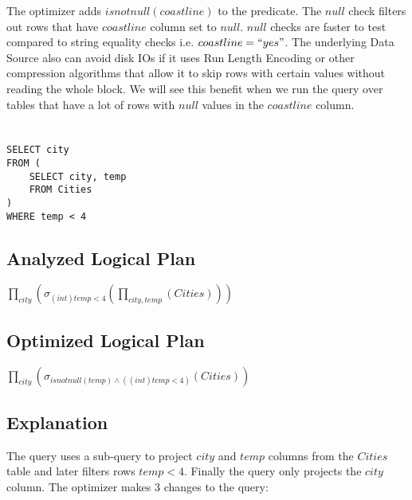 \documentclass[12pt]{article}
\begin{document}
The optimizer adds $isnotnull(coastline)$ to the predicate. The $ null$ check filters out rows that have $coastline$ column set to $null$. $null$ checks are faster to test compared to string equality checks i.e. $coastline = ``yes"$. The underlying Data Source also can avoid disk IOs if it uses Run Length Encoding or other compression algorithms that allow it to skip rows with certain values without reading the whole block. We will see this benefit when we run the query over tables that have a lot of rows with $null$ values in the $coastline$ column. 
\newpage

\section{}
\begin{verbatim}
SELECT city
FROM (
    SELECT city, temp
    FROM Cities
)
WHERE temp < 4
\end{verbatim}

\subsection*{Analyzed Logical Plan}

$\prod_{city}(\sigma_{(int)temp < 4}(\prod_{city, temp}(Cities)))$

\subsection*{Optimized Logical Plan}

$\prod_{city}(\sigma_{isnotnull(temp) \wedge ((int)temp < 4)}(Cities))$

\subsection*{Explanation}

The query uses a sub-query to project $city$ and $temp$ columns from the $Cities$ table and later filters rows $temp < 4$. Finally the query only projects the $city$ column. The optimizer makes 3 changes to the query:
\end{document}
